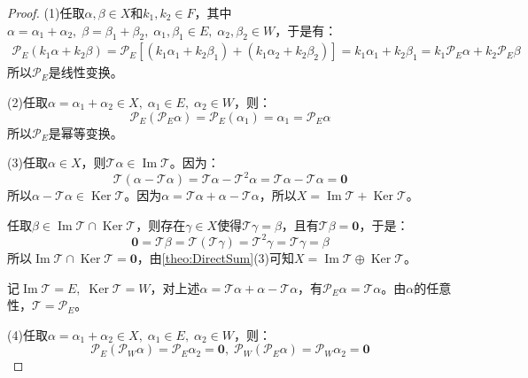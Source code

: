 \begin{proof}
	(1)任取$\alpha,\beta\in X$和$k_1,k_2\in F$，其中$\alpha=\alpha_1+\alpha_2,\;\beta=\beta_1+\beta_2,\;\alpha_1,\beta_1\in E,\;\alpha_2,\beta_2\in W$，于是有：
	\begin{align*}
		\mathcal{P}_E(k_1\alpha+k_2\beta)
		=\mathcal{P}_E[(k_1\alpha_1+k_2\beta_1)+(k_1\alpha_2+k_2\beta_2)]
		=k_1\alpha_1+k_2\beta_1
		=k_1\mathcal{P}_E\alpha+k_2\mathcal{P}_E\beta
	\end{align*}
	所以$\mathcal{P}_E$是线性变换。\par
	(2)任取$\alpha=\alpha_1+\alpha_2\in X,\;\alpha_1\in E,\;\alpha_2\in W$，则：
	\begin{equation*}
		\mathcal{P}_E(\mathcal{P}_E\alpha)=\mathcal{P}_E(\alpha_1)=\alpha_1=\mathcal{P}_E\alpha
	\end{equation*}
	所以$\mathcal{P}_E$是幂等变换。\par
	(3)任取$\alpha\in X$，则$\mathcal{T}\alpha\in\operatorname{Im}\mathcal{T}$。因为：
	\begin{equation*}
		\mathcal{T}(\alpha-\mathcal{T}\alpha)=\mathcal{T}\alpha-\mathcal{T}^2\alpha=\mathcal{T}\alpha-\mathcal{T}\alpha=\mathbf{0}
	\end{equation*}
	所以$\alpha-\mathcal{T}\alpha\in\operatorname{Ker}\mathcal{T}$。因为$\alpha=\mathcal{T}\alpha+\alpha-\mathcal{T}\alpha$，所以$X=\operatorname{Im}\mathcal{T}+\operatorname{Ker}\mathcal{T}$。\par
	任取$\beta\in\operatorname{Im}\mathcal{T}\cap\operatorname{Ker}\mathcal{T}$，则存在$\gamma\in X$使得$\mathcal{T}\gamma=\beta$，且有$\mathcal{T}\beta=\mathbf{0}$，于是：
	\begin{equation*}
		\mathbf{0}=\mathcal{T}\beta=\mathcal{T}(\mathcal{T}\gamma)=\mathcal{T}^2\gamma=\mathcal{T}\gamma=\beta
	\end{equation*}
	所以$\operatorname{Im}\mathcal{T}\cap\operatorname{Ker}\mathcal{T}=\mathbf{0}$，由\cref{theo:DirectSum}(3)可知$X=\operatorname{Im}\mathcal{T}\oplus\operatorname{Ker}\mathcal{T}$。\par
	记$\operatorname{Im}\mathcal{T}=E,\;\operatorname{Ker}\mathcal{T}=W$，对上述$\alpha=\mathcal{T}\alpha+\alpha-\mathcal{T}\alpha$，有$\mathcal{P}_E\alpha=\mathcal{T}\alpha$。由$\alpha$的任意性，$\mathcal{T}=\mathcal{P}_E$。\par
	(4)任取$\alpha=\alpha_1+\alpha_2\in X,\;\alpha_1\in E,\;\alpha_2\in W$，则：
	\begin{equation*}
		\mathcal{P}_E(\mathcal{P}_W\alpha)=\mathcal{P}_E\alpha_2=\mathbf{0},\;
		\mathcal{P}_W(\mathcal{P}_E\alpha)=\mathcal{P}_W\alpha_2=\mathbf{0}

\end{equation*}
\end{proof}
